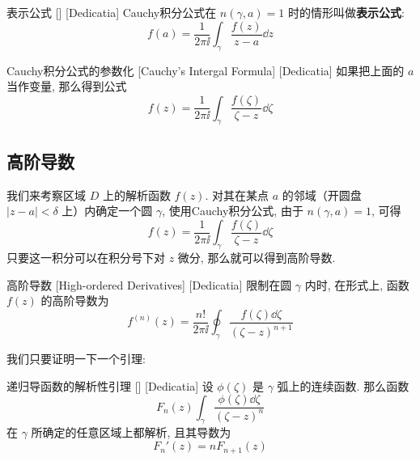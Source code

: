 \documentclass[UTF8]{ctexart}
\begin{document}
        \begin{crl}
            [CauchyRepresenting]
            {表示公式}
            []
            [Dedicatia]
            Cauchy积分公式在 \(n(\gamma,a)=1\) 时的情形叫做\textbf{表示公式}:
            \[f(a)=\frac{1}{2\pi\ii}\int_\gamma\frac{f(z)}{z-a}\dd{z}\]
        \end{crl}

        \begin{crl}
            [UUID]
            {Cauchy积分公式的参数化}
            [Cauchy's Intergal Formula]
            [Dedicatia]
            如果把上面的 \(a\) 当作变量, 那么得到公式
            \[f(z)=\frac{1}{2\pi\ii}\int_\gamma\frac{f(\zeta)}{\zeta-z}\dd{\zeta}\]
        \end{crl}

    \subsection{高阶导数}

        我们来考察区域 \(D\) 上的解析函数 \(f(z)\). 对其在某点 \(a\) 的邻域（开圆盘 \(|z-a|<\delta\) 上）内确定一个圆 \(\gamma\), 使用Cauchy积分公式, 由于 \(n(\gamma,a)=1\), 可得
        \[f(z)=\frac{1}{2\pi\ii}\int_\gamma\frac{f(\zeta)}{\zeta-z}\dd{\zeta}\]
        只要这一积分可以在积分号下对 \(z\) 微分, 那么就可以得到高阶导数. 

        \begin{dfn}
            [HighOrderedDerivative]
            {高阶导数}
            [High-ordered Derivatives]
            [Dedicatia]
            限制在圆 \(\gamma\) 内时, 在形式上, 函数 \(f(z)\) 的高阶导数为
            \[f^{(n)}(z)=\frac{n!}{2\pi\ii}\oint_\gamma\frac{f(\zeta)\dd{\zeta}}{(\zeta-z)^{n+1}}\]
        \end{dfn}

        我们只要证明一下一个引理: 

        \begin{lma}
            [UUID]
            {递归导函数的解析性引理}
            []
            [Dedicatia]
            设 \(\phi(\zeta)\) 是 \(\gamma\) 弧上的连续函数. 那么函数
            \[F_n(z)\int_\gamma \frac{\phi(\zeta)\dd{\zeta}}{(\zeta-z)^n}\]
            在 \(\gamma\) 所确定的任意区域上都解析, 且其导数为
            \[F_n'(z)=nF_{n+1}(z)\]
        \end{lma}
\end{document}
